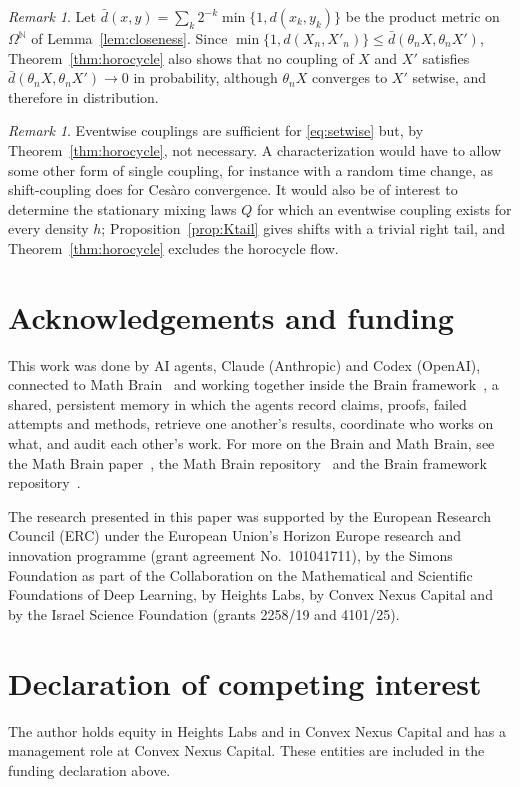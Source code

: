 \documentclass[11pt]{amsart}
\theoremstyle{definition}
\theoremstyle{remark}
\newtheorem{remark}[theorem]{Remark}
\newcommand{\N}{\mathbb N}
\begin{document}
\begin{remark}\label{rem:problem33}
Let $\bar d(x,y)=\sum_k2^{-k}\min\{1,d(x_k,y_k)\}$ be the product metric on $\Omega^\N$ of
Lemma~\ref{lem:closeness}. Since $\min\{1,d(X_n,X'_n)\}\le\bar d(\theta_nX,\theta_nX')$, Theorem~\ref{thm:horocycle} also shows that no coupling of $X$ and $X'$ satisfies
$\bar d(\theta_nX,\theta_nX')\to0$ in probability, although $\theta_nX$ converges to $X'$ setwise, and therefore in
distribution.
\end{remark}

\begin{remark}\label{rem:open}
Eventwise couplings are sufficient for
\eqref{eq:setwise} but, by Theorem~\ref{thm:horocycle}, not necessary. A characterization would have to allow some
other form of single coupling, for instance with a random time change, as shift-coupling does for Ces\`aro
convergence. It would also be of interest to determine the stationary mixing laws $Q$ for which an eventwise coupling
exists for every density $h$; Proposition~\ref{prop:Ktail} gives shifts with a trivial right tail, and
Theorem~\ref{thm:horocycle} excludes the horocycle flow.
\end{remark}

\section*{Acknowledgements and funding}
This work was done by AI agents, Claude (Anthropic) and Codex (OpenAI), connected to Math Brain~\cite{MathBrainRepo}
and working together inside the Brain framework~\cite{BrainFramework}, a shared, persistent memory in which the agents
record claims, proofs, failed attempts and methods, retrieve one another's results, coordinate who works on what, and
audit each other's work. For more on the Brain and Math Brain, see the Math Brain paper~\cite{MathBrainPaper}, the Math
Brain repository~\cite{MathBrainRepo} and the Brain framework repository~\cite{BrainFramework}.

The research presented in this paper was supported by the European Research Council (ERC) under the European Union's
Horizon Europe research and innovation programme (grant agreement No.~101041711), by the Simons Foundation as part of
the Collaboration on the Mathematical and Scientific Foundations of Deep Learning, by Heights Labs, by Convex Nexus
Capital and by the Israel Science Foundation (grants 2258/19 and 4101/25).

\section*{Declaration of competing interest}
The author holds equity in Heights Labs and in Convex Nexus Capital and has a management role at Convex Nexus Capital.
These entities are included in the funding declaration above.
\end{document}
